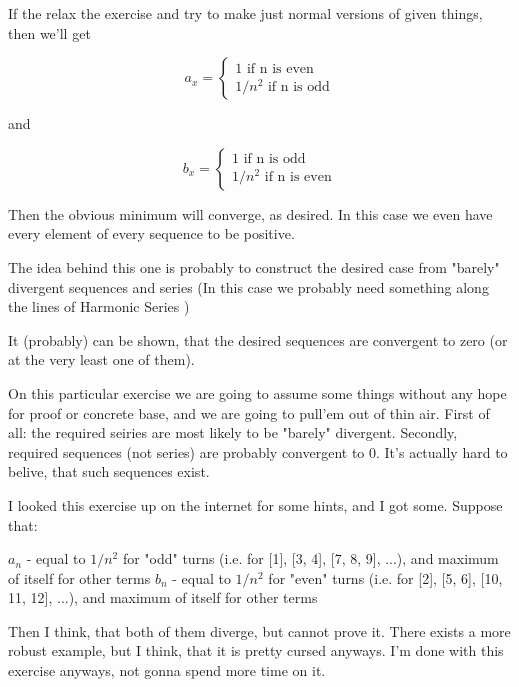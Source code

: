 \documentclass[11pt,oneside,titlepage]{book}
\begin{document}
If the relax the exercise and try to make just normal versions of given things, then we'll get

\begin{equation}
  a_x =
  \begin{cases}
    1 \text{ if n is even} \\
    1/n^2 \text{ if n is odd}
  \end{cases}
\end{equation}

and

\begin{equation}
  b_x =
  \begin{cases}
    1 \text{ if n is odd} \\
    1/n^2 \text{ if n is even}
  \end{cases}
\end{equation}

Then the obvious minimum will converge, as desired. In this case we even have
every element of every sequence to be positive.

The idea behind this one is probably to construct the desired case from
"barely" divergent sequences and series (In this case we probably need
something along the lines of Harmonic Series )

It (probably) can be shown, that the desired sequences are convergent to zero
(or at the very least one of them).

On this particular exercise we are going to assume some things without any
hope for proof or concrete base, and we are going to pull'em out of thin air.
First of all: the required seiries are most likely to be "barely" divergent.
Secondly, required sequences (not series) are probably convergent to 0. It's
actually hard to belive, that such sequences exist.

I looked this exercise up on the internet for some hints, and I got some.
Suppose that:

$a_n$ - equal to $1/n^2$ for "odd" turns (i.e. for [1], [3, 4], [7, 8, 9], ...),
and maximum of itself for other terms
$b_n$ - equal to $1/n^2$ for "even" turns (i.e. for [2], [5, 6], [10, 11, 12], ...), and maximum of itself for other terms

Then I think, that both of them diverge, but cannot prove it. There exists a
more robust example, but I think, that it is pretty cursed anyways. I'm done
with this exercise anyways, not gonna spend more time on it.
\end{document}
